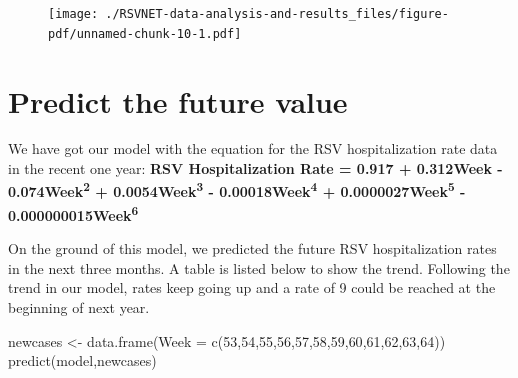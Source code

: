 \documentclass[
  letterpaper,
  DIV=11,
  numbers=noendperiod]{scrreport}
\newenvironment{Shaded}{\begin{snugshade}}{\end{snugshade}}
\newcommand{\AttributeTok}[1]{\textcolor[rgb]{0.40,0.45,0.13}{#1}}
\newcommand{\ConstantTok}[1]{\textcolor[rgb]{0.56,0.35,0.01}{#1}}
\newcommand{\DecValTok}[1]{\textcolor[rgb]{0.68,0.00,0.00}{#1}}
\newcommand{\FunctionTok}[1]{\textcolor[rgb]{0.28,0.35,0.67}{#1}}
\newcommand{\NormalTok}[1]{\textcolor[rgb]{0.00,0.23,0.31}{#1}}
\newcommand{\OtherTok}[1]{\textcolor[rgb]{0.00,0.23,0.31}{#1}}
\newcommand{\SpecialCharTok}[1]{\textcolor[rgb]{0.37,0.37,0.37}{#1}}
\begin{document}
\begin{Shaded}
\end{Shaded}

\begin{figure}[H]

{\centering \texttt{[image: ./RSVNET-data-analysis-and-results\_files/figure-pdf/unnamed-chunk-10-1.pdf]}

}

\end{figure}

\hypertarget{predict-the-future-value}{%
\section{Predict the future value}\label{predict-the-future-value}}

We have got our model with the equation for the RSV hospitalization rate
data in the recent one year: \textbf{RSV Hospitalization Rate = 0.917 +
0.312Week - 0.074Week\textsuperscript{2} + 0.0054Week\textsuperscript{3}
- 0.00018Week\textsuperscript{4} + 0.0000027Week\textsuperscript{5} -
0.000000015Week\textsuperscript{6}}

On the ground of this model, we predicted the future RSV hospitalization
rates in the next three months. A table is listed below to show the
trend. Following the trend in our model, rates keep going up and a rate
of 9 could be reached at the beginning of next year.

\begin{Shaded}
\begin{Highlighting}[]
\NormalTok{newcases }\OtherTok{\textless{}{-}} \FunctionTok{data.frame}\NormalTok{(}\AttributeTok{Week =} \FunctionTok{c}\NormalTok{(}\DecValTok{53}\NormalTok{,}\DecValTok{54}\NormalTok{,}\DecValTok{55}\NormalTok{,}\DecValTok{56}\NormalTok{,}\DecValTok{57}\NormalTok{,}\DecValTok{58}\NormalTok{,}\DecValTok{59}\NormalTok{,}\DecValTok{60}\NormalTok{,}\DecValTok{61}\NormalTok{,}\DecValTok{62}\NormalTok{,}\DecValTok{63}\NormalTok{,}\DecValTok{64}\NormalTok{))}
\FunctionTok{predict}\NormalTok{(model,newcases)}
\end{Highlighting}
\end{Shaded}
\end{document}
